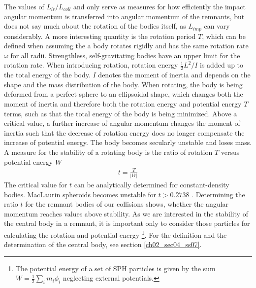 The values of $L_{lr} / L_{coll}$ and only serve as measures for how efficiently the impact angular momentum is transferred into angular momentum of the remnants, but does not say much about the rotation of the bodies itself, as $L_{imp}$ can vary considerably. A more interesting quantity is the rotation period $T$, which can be defined when assuming the a body rotates rigidly and has the same rotation rate $\omega$ for all radii. Strengthless, self-gravitating bodies have an upper limit for the rotation rate. When introducing rotation, rotation energy $\frac{1}{2} L^2 / I$ is added up to the total energy of the body. $I$ denotes the moment of inertia and depends on the shape and the mass distribution of the body. When rotating, the body is being deformed from a perfect sphere to an ellipsoidal shape, which changes both the moment of inertia and therefore both the rotation energy and potential energy $T$ terms, such as that the total energy of the body is being minimized. Above a critical value, a further increase of angular momentum changes the moment of inertia such that the decrease of rotation energy does no longer compensate the increase of potential energy. The body becomes secularly unstable and loses mass. A measure for the stability of a rotating body is the ratio of rotation $T$ versus potential energy $W$
\begin{align}
t = \frac{T}{|W|}
\end{align}
The critical value for $t$ can be analytically determined for constant-density bodies. MacLaurin spheroids becomes unstable for $t > 0.2738$ \citep{chandrasekhar1969ellipsoidal, 1987gady.book.....B}. Determining the ratio $t$ for the remnant bodies of our collisions shows, whether the angular momentum reaches values above stability. As we are interested in the stability of the central body in a remnant, it is important only to consider those particles for calculating the rotation and potential energy \footnote{The potential energy of a set of SPH particles is given by the sum $W = \frac{1}{2} \sum_{i} m_i \phi_i$ neglecting external potentials.}. For the definition and the determination of the central body, see section \ref{ch02_sec04_ss07}.

